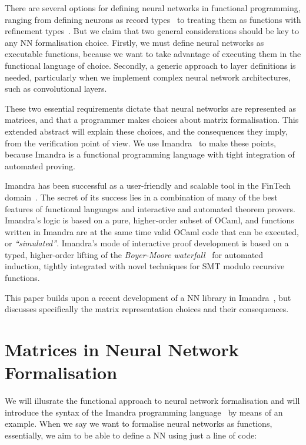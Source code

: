 \documentclass[runningheads]{llncs}
\begin{document}
There are several options for defining neural networks in functional
programming, ranging from defining neurons as record types~\cite{MariaBLFGRG22}
to treating them as functions with refinement types~\cite{KokkeKKAA20}. But we
claim that two general considerations should be key to any NN formalisation
choice. Firstly, we must define neural networks as executable
functions, because we want to take advantage of executing them in the functional
language of choice. Secondly, a generic approach to layer definitions is needed,
particularly when we implement complex neural network architectures, such as
convolutional layers.

These two essential requirements dictate that neural networks are represented as
matrices, and that a programmer makes choices about matrix formalisation. This
extended abstract will explain these choices, and the consequences they imply,
from the verification point of view. We use Imandra~\cite{PassmoreCIABKKM20} to
make these points, because Imandra is a functional programming language with
tight integration of automated proving.

Imandra has been successful as a user-friendly and scalable tool in the FinTech
domain~\cite{Passmore21}. The secret of its success lies in a combination of
many of the best features of functional languages and interactive and automated
theorem provers. Imandra's logic is based on a pure, higher-order subset of
OCaml, and functions written in Imandra are at the same time valid OCaml code
that can be executed, or \emph{``simulated''}. Imandra's mode of interactive
proof development is based on a typed, higher-order lifting of the
\emph{Boyer-Moore waterfall}~\cite{BM79} for automated induction, tightly
integrated with novel techniques for SMT modulo recursive functions.

This paper builds upon a recent development of a NN library in Imandra~\cite{DPKD22}, but
discusses specifically the matrix representation choices and their consequences.  


\section{Matrices in Neural Network Formalisation}
We will illusrate the functional approach to neural network formalisation and
will introduce the syntax of the Imandra programming
language~\cite{PassmoreCIABKKM20} by means of an example. When we say we want to
formalise neural networks as functions, essentially, we aim to be able to define
a NN using just a line of code:
\end{document}
